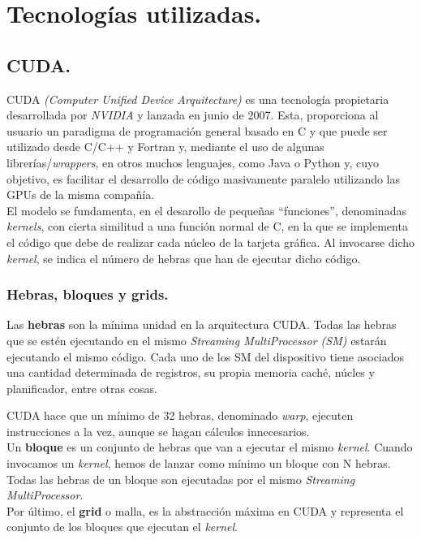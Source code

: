 \chapter{Tecnologías utilizadas.}
\section{CUDA.}
CUDA \textit{(Computer Unified Device Arquitecture)} \cite{cuda} es una tecnología propietaria desarrollada por \textit{NVIDIA} y lanzada en junio de 2007. Esta, proporciona al usuario un paradigma de programación general basado en C y que puede ser utilizado desde C/C++ y Fortran y, mediante el uso de algunas librerías/\textit{wrappers}, en otros muchos lenguajes, como Java o Python y, cuyo objetivo, es facilitar el desarrollo de código masivamente paralelo utilizando las GPUs de la misma compañía.\\

El modelo se fundamenta, en el desarollo de pequeñas ``funciones'', denominadas \textit{kernels}, con cierta similitud a una función normal de C, en la que se implementa el código que debe de realizar cada núcleo de la tarjeta gráfica. Al invocarse dicho \textit{kernel}, se indica el número de hebras que han de ejecutar dicho código. 

\subsection{Hebras, bloques y grids.}
Las \textbf{hebras} son la mínima unidad en la arquitectura CUDA.  Todas las hebras que se estén ejecutando en el mismo \textit{Streaming MultiProcessor (SM)} estarán ejecutando el mismo código. Cada uno de los SM del dispositivo tiene asociados una cantidad determinada de registros, su propia memoria caché, núcles y planificador, entre otras cosas.

CUDA hace que un mínimo de 32 hebras, denominado \textit{warp}, ejecuten instrucciones a la vez, aunque se hagan cálculos innecesarios.\\

Un \textbf{bloque} es un conjunto de hebras que van a ejecutar el mismo \textit{kernel}. Cuando invocamos un \textit{kernel}, hemos de lanzar como mínimo un bloque con N hebras. Todas las hebras de un bloque son ejecutadas por el mismo \textit{Streaming MultiProcessor}.\\

Por último, el \textbf{grid} o malla, es la abstracción máxima en CUDA y representa el conjunto de los bloques que ejecutan el \textit{kernel}. \\

